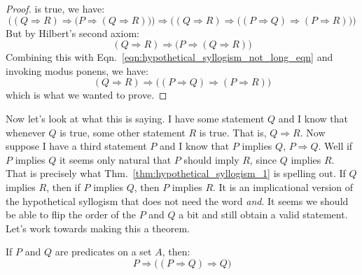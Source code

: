 \begin{proof}
        is true, we have:
        \begin{equation}
            \label{eqn:hypothetical_syllogism_not_long_eqn}%
            \Big(
                (Q\Rightarrow{R})\Rightarrow
                \big(
                    P\Rightarrow(Q\Rightarrow{R})
                \big)
            \Big)
            \Rightarrow
            \Big(
                (Q\Rightarrow{R})
                \Rightarrow
                \big(
                    (P\Rightarrow{Q})\Rightarrow(P\Rightarrow{R})
                \big)
            \Big)
        \end{equation}
        But by Hilbert's second axiom:
        \begin{equation}
            (Q\Rightarrow{R})\Rightarrow
            \big(
                P\Rightarrow(Q\Rightarrow{R})
            \big)
        \end{equation}
        Combining this with Eqn.~\ref{eqn:hypothetical_syllogism_not_long_eqn}
        and invoking modus ponens, we have:
        \begin{equation}
            (Q\Rightarrow{R})
            \Rightarrow
            \big(
                (P\Rightarrow{Q})\Rightarrow(P\Rightarrow{R})
            \big)
        \end{equation}
        which is what we wanted to prove.
    \end{proof}
    Now let's look at what this is saying. I have some statement $Q$ and I know
    that whenever $Q$ is true, some other statement $R$ is true. That is,
    $Q\Rightarrow{R}$. Now suppose I have a third statement $P$ and I know that
    $P$ implies $Q$, $P\Rightarrow{Q}$. Well if $P$ implies $Q$ it seems only
    natural that $P$ should imply $R$, since $Q$ implies $R$. That is precisely
    what Thm.~\ref{thm:hypothetical_syllogism_1} is spelling out. If $Q$ implies
    $R$, then if $P$ implies $Q$, then $P$ implies $R$. It is an implicational
    version of the hypothetical syllogism that does not need the word
    \textit{and}. It seems we should be able to flip the order of the $P$ and
    $Q$ a bit and still obtain a valid statement. Let's work towards making this
    a theorem.
    \begin{theorem}
        \label{thm:precursor_to_hypothetical_syllogism_2}%
        If $P$ and $Q$ are predicates on a set $A$, then:
        \begin{equation*}
            P\Rightarrow
            \big(
                (P\Rightarrow{Q})\Rightarrow{Q}
            \big)
        \end{equation*}
    \end{theorem}
